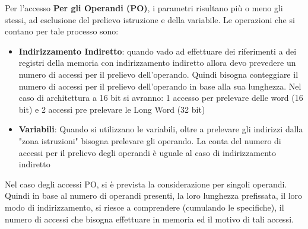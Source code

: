 Per l'accesso \textbf{Per gli Operandi (PO)}, i parametri risultano più o meno gli stessi, ad esclusione del prelievo istruzione e della variabile. Le operazioni che si contano per tale processo sono:
\begin{itemize}
    \item \textbf{Indirizzamento Indiretto}: quando vado ad effettuare dei riferimenti a dei registri della memoria con indirizzamento indiretto allora devo prevedere un numero di accessi per il prelievo dell'operando. Quindi bisogna conteggiare il numero di accessi per il prelievo dell'operando in base alla sua lunghezza. Nel caso di architettura a 16 bit si avranno: 1 accesso per prelevare delle word (16 bit) e 2 accessi pre prelevare le Long Word (32 bit)

    \item \textbf{Variabili}: Quando si utilizzano le variabili, oltre a prelevare gli indirizzi dalla "zona istruzioni" bisogna prelevare gli operando. La conta del numero di accessi per il prelievo degli operandi è uguale al caso di indirizzamento indiretto
\end{itemize}

Nel caso degli accessi PO, si è prevista la considerazione per singoli operandi. Quindi in base al numero di operandi presenti, la loro lunghezza prefissata, il loro modo di indirizzamento, si riesce a comprendere (cumulando le specifiche), il numero di accessi che bisogna effettuare in memoria ed il motivo di tali accessi.
